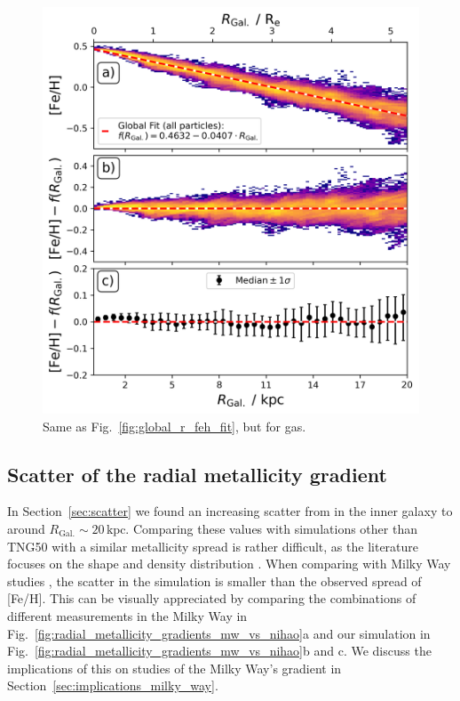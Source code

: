 \documentclass[twocolumn,apj,numberedappendix,appendixfloats,twocolappendix]{openjournal}
\begin{document}
\begin{CJK*}{UTF8}{gbsn}
\begin{figure}
    \centering
    \includegraphics[width=\columnwidth]{figures/global_r_feh_fit_gas.png}
    \caption{Same as Fig.~\ref{fig:global_r_feh_fit}, but for gas.}
    \label{fig:global_r_feh_fit_gas}
\end{figure}

\subsection{Scatter of the radial metallicity gradient} \label{sec:discussion_scatter}

In Section~\ref{sec:scatter} we found an increasing scatter from  in the inner galaxy to  around $R_\mathrm{Gal.} \sim 20\,\mathrm{kpc}$. Comparing these values with simulations other than TNG50 with a similar metallicity spread \citep[see Fig.~2 by][]{Hemler2021} is rather difficult, as the literature focuses on the shape and density distribution \citep[see e.g.][their Fig.~10]{Minchev2014b}. When comparing with Milky Way studies \citep[e.g.][]{Anders2017}, the scatter in the simulation is smaller than the observed spread of [Fe/H]. This can be visually appreciated by comparing the combinations of different measurements in the Milky Way \citep{Genovali2014, Spina2021, Myers2022} in Fig.~\ref{fig:radial_metallicity_gradients_mw_vs_nihao}a and our simulation in Fig.~\ref{fig:radial_metallicity_gradients_mw_vs_nihao}b and c. We discuss the implications of this on studies of the Milky Way's gradient in Section~\ref{sec:implications_milky_way}.


\end{CJK*}
\end{document}

